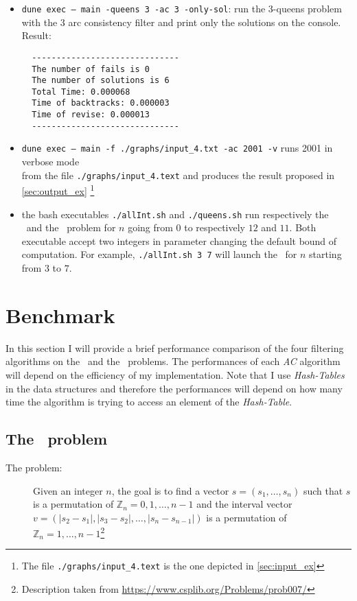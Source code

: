 \documentclass{rapport}
\begin{document}
\begin{itemize}
  \item \texttt{dune exec -- main -queens 3 -ac 3 -only-sol}: run the 3-queens problem with the \ac{3} arc consistency filter and print only the solutions on the console. Result:
        \begin{verbatim}
  ------------------------------
  The number of fails is 0
  The number of solutions is 6
  Total Time: 0.000068
  Time of backtracks: 0.000003
  Time of revise: 0.000013
  ------------------------------
  \end{verbatim}

  \item \texttt{dune exec -- main -f ./graphs/input\_4.txt -ac 2001 -v} runs \ac{2001} in verbose mode \\ from the file \texttt{./graphs/input\_4.text} and produces the result proposed in \cref{sec:output_ex} \footnote{The file \texttt{./graphs/input\_4.text} is the one depicted in \cref{sec:input_ex}}

  \item the bash executables \texttt{./allInt.sh} and \texttt{./queens.sh} run respectively the \allint\ and the \queens\ problem for $n$ going from $0$ to respectively $12$ and $11$. Both executable accept two integers in parameter changing the default bound of computation. For example, \texttt{./allInt.sh 3 7} will launch the \allint\ for $n$ starting from $3$ to $7$.

\end{itemize}



\section{Benchmark}

In this section I will provide a brief performance comparison of the four filtering algorithms on the \allint\ and the \queens\ problems. The performances of each \textit{AC} algorithm will depend on the efficiency of my implementation. Note that I use \textit{Hash-Tables} in the data structures and therefore the performances will depend on how many time the algorithm is trying to access an element of the \textit{Hash-Table}.

\subsection{The \allint\ problem}

\begin{description}
  \item[The problem:] Given an integer $n$, the goal is to find a vector $s = (s_1, \dots, s_n)$ such that $s$ is a permutation of $\mathbb{Z}_n = 0, 1, \dots, n - 1$ and the interval vector $v = (|s_2-s_1|, |s_3-s_2|,\dots, |s_n-s_{n-1}|)$ is a permutation of $\mathbb{Z}_n = 1, \dots, n - 1$\footnote{Description taken from \url{https://www.csplib.org/Problems/prob007/}}
\end{description}
\end{document}
